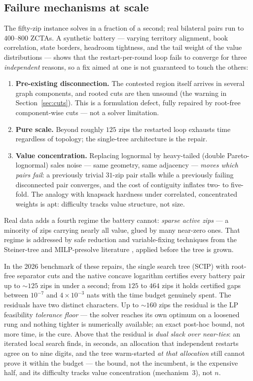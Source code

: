 \documentclass[11pt]{article}
\theoremstyle{remark}\newtheorem*{remark}{Remark}
\begin{document}
\subsection{Failure mechanisms at scale}\label{sec:mechanisms}
The fifty-zip instance solves in a fraction of a second; real bilateral pairs run to
$400$--$800$ ZCTAs. A synthetic battery --- varying territory alignment, book
correlation, state borders, headroom tightness, and the tail weight of the value
distributions --- shows that the restart-per-round loop fails to converge for three
\emph{independent} reasons, so a fix aimed at one is not guaranteed to touch the others:
\begin{enumerate}[leftmargin=*,itemsep=2pt]
\item \textbf{Pre-existing disconnection.} The contested region itself arrives in
several graph components, and rooted cuts are then unsound (the warning in
Section~\ref{sec:cuts}). This is a formulation defect, fully repaired by root-free
component-wise cuts --- not a solver limitation.
\item \textbf{Pure scale.} Beyond roughly $125$ zips the restarted loop exhausts time
regardless of topology; the single-tree architecture is the repair.
\item \textbf{Value concentration.} Replacing lognormal by heavy-tailed
(double Pareto-lognormal) sales noise --- same geometry, same adjacency --- \emph{moves
which pairs fail}: a previously trivial $31$-zip pair stalls while a previously failing
disconnected pair converges, and the cost of contiguity inflates two- to five-fold.
The analogy with knapsack hardness under correlated, concentrated weights
\citep{pisinger2005} is apt: difficulty tracks value structure, not size.
\end{enumerate}
Real data adds a fourth regime the battery cannot: \emph{sparse active zips} ---
a minority of zips carrying nearly all value, glued by many near-zero ones. That regime
is addressed by safe reduction and variable-fixing techniques from the Steiner-tree and
MILP-presolve literature \citep{rehfeldt2019,buchanan2018,fischetti2017}, applied before
the tree is grown.

In the 2026 benchmark of these repairs, the single search tree (SCIP) with root-free
separator cuts and the native concave logarithm certifies every battery pair up to
$\sim$$125$ zips in under a second; from $125$ to $464$ zips it holds certified gaps
between $10^{-7}$ and $4\times10^{-3}$ nats with the time budget genuinely spent. The
residuals have two distinct characters. Up to $\sim$$160$ zips the residual is the LP
feasibility \emph{tolerance floor} --- the solver reaches its own optimum on a loosened
rung and nothing tighter is numerically available; an exact post-hoc bound, not more
time, is the cure. Above that the residual is \emph{dual slack over near-ties}: an
iterated local search finds, in seconds, an allocation that independent restarts agree
on to nine digits, and the tree warm-started \emph{at that allocation} still cannot
prove it within the budget --- the bound, not the incumbent, is the expensive half, and
its difficulty tracks value concentration (mechanism~3), not $n$.
\end{document}
